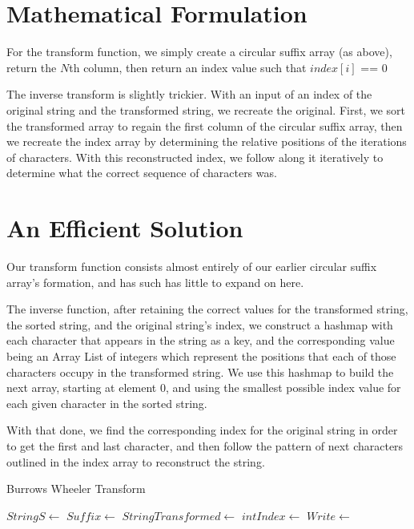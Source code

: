\documentclass[12pt]{article}
\begin{document}
\section{Mathematical Formulation}
For the transform function, we simply create a circular suffix array (as above), return the $N$th column, then return an index value such that $index[i]$ == $0$

The inverse transform is slightly trickier. With an input of an index of the original string and the transformed string, we recreate the original. First, we sort the transformed array to regain the first column of the circular suffix array, then we recreate the index array by determining the relative positions of the iterations of characters. With this reconstructed index, we follow along it iteratively to determine what the correct sequence of characters was.

\section{An Efficient Solution}

Our transform function consists almost entirely of our earlier circular suffix array's formation, and has such has little to expand on here.

The inverse function, after retaining the correct values for the transformed string, the sorted string, and the original string's index, we construct a hashmap with each character that appears in the string as a key, and the corresponding value being an Array List of integers which represent the positions that each of those characters occupy in the transformed string. We use this hashmap to build the next array, starting at element $0$, and using the smallest possible index value for each given character in the sorted string.

With that done, we find the corresponding index for the original string in order to get the first and last character, and then follow the pattern of next characters outlined in the index array to reconstruct the string.

\begin{algorithm}[H]
\caption{Burrows Wheeler Transform}
\begin{algorithmic}
        \State $String S \gets$ 
        \State $Suffix \gets$ 
        \State $String Transformed \gets$ 
        \State $int Index \gets$ 
        \State $Write \gets$ 
    \EndProcedure
\end{algorithmic}
\end{algorithm}
\end{document}
